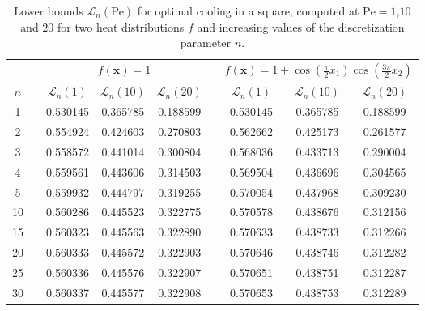 \documentclass[a4paper, 10pt]{amsart}
\numberwithin{equation}{section}
\theoremstyle{plain}
\theoremstyle{definition}
\theoremstyle{remark}
\newcommand{\Pe}{\mathrm{Pe}}
\renewcommand{\vec}[1]{\mathbf{#1}}
\newcommand{\lb}{\mathcal{L}}
\begin{document}
\begin{table}[t]
    \centering
    \caption{
        \label{tab:square-results}
        Lower bounds $\lb_n(\Pe)$ for optimal cooling in a square, computed at $\Pe=1$,$10$ and $20$ for two heat distributions $f$ and increasing values of the discretization parameter $n$.
    }
    \begin{tabular}{c c ccc c ccc}
        \toprule
        && \multicolumn{3}{c}{$f(\vec{x}) = 1$}
        && \multicolumn{3}{c}{$f(\vec{x}) = 1 + \cos(\frac\pi2 x_1) \cos(\frac{3\pi}{2} x_2)$}
        \\
        \cmidrule{3-5} \cmidrule{7-9}
        $n$
        && $\lb_n(1)$  & $\lb_n(10)$  & $\lb_n(20)$ 
        && $\lb_n(1)$  & $\lb_n(10)$  & $\lb_n(20)$ 
        \\[0.75ex]
          1 && 0.530145 & 0.365785 & 0.188599 && 0.530145 & 0.365785 & 0.188599\\ 
          2 && 0.554924 & 0.424603 & 0.270803 && 0.562662 & 0.425173 & 0.261577\\ 
          3 && 0.558572 & 0.441014 & 0.300804 && 0.568036 & 0.433713 & 0.290004\\ 
          4 && 0.559561 & 0.443606 & 0.314503 && 0.569504 & 0.436696 & 0.304565\\ 
          5 && 0.559932 & 0.444797 & 0.319255 && 0.570054 & 0.437968 & 0.309230\\[0.75ex] %
         10 && 0.560286 & 0.445523 & 0.322775 && 0.570578 & 0.438676 & 0.312156\\ 
         15 && 0.560323 & 0.445563 & 0.322890 && 0.570633 & 0.438733 & 0.312266\\ 
         20 && 0.560333 & 0.445572 & 0.322903 && 0.570646 & 0.438746 & 0.312282\\ 
         25 && 0.560336 & 0.445576 & 0.322907 && 0.570651 & 0.438751 & 0.312287\\ 
         30 && 0.560337 & 0.445577 & 0.322908 && 0.570653 & 0.438753 & 0.312289\\ 
        \bottomrule
    \end{tabular}
\end{table}
\end{document}
